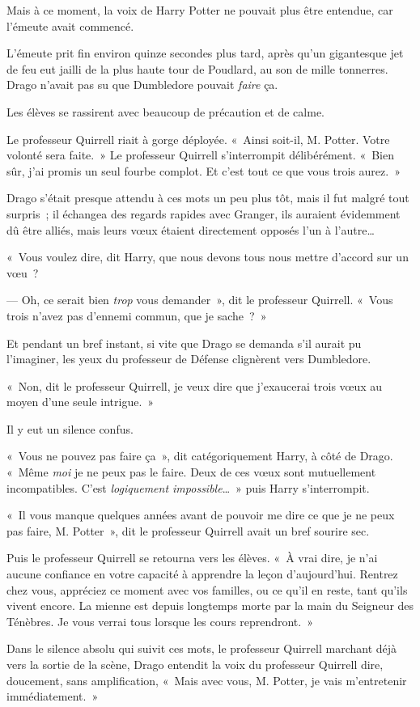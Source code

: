 Mais à ce moment, la voix de Harry Potter ne pouvait plus être entendue, car l'émeute avait commencé.

\later

L'émeute prit fin environ quinze secondes plus tard, après qu'un gigantesque jet de feu eut jailli de la plus haute tour de Poudlard, au son de mille tonnerres. Drago n'avait pas su que Dumbledore pouvait \emph{faire} ça.

Les élèves se rassirent avec beaucoup de précaution et de calme.

Le professeur Quirrell riait à gorge déployée. «~Ainsi soit-il, M. Potter. Votre volonté sera faite.~» Le professeur Quirrell s'interrompit délibérément. «~Bien sûr, j'ai promis un seul fourbe complot. Et c'est tout ce que vous trois aurez.~»

Drago s'était presque attendu à ces mots un peu plus tôt, mais il fut malgré tout surpris~; il échangea des regards rapides avec Granger, ils auraient évidemment dû être alliés, mais leurs vœux étaient directement opposés l'un à l'autre…

«~Vous voulez dire, dit Harry, que nous devons tous nous mettre d'accord sur un vœu~?

--- Oh, ce serait bien \emph{trop} vous demander~», dit le professeur Quirrell. «~Vous trois n'avez pas d'ennemi commun, que je sache~?~»

Et pendant un bref instant, si vite que Drago se demanda s'il aurait pu l'imaginer, les yeux du professeur de Défense clignèrent vers Dumbledore.

«~Non, dit le professeur Quirrell, je veux dire que j'exaucerai trois vœux au moyen d'une seule intrigue.~»

Il y eut un silence confus.

«~Vous ne pouvez pas faire ça~», dit catégoriquement Harry, à côté de Drago. «~Même \emph{moi} je ne peux pas le faire. Deux de ces vœux sont mutuellement incompatibles. C'est \emph{logiquement impossible}…~» puis Harry s'interrompit.

«~Il vous manque quelques années avant de pouvoir me dire ce que je ne peux pas faire, M. Potter~», dit le professeur Quirrell avait un bref sourire sec.

Puis le professeur Quirrell se retourna vers les élèves. «~À vrai dire, je n'ai aucune confiance en votre capacité à apprendre la leçon d'aujourd'hui. Rentrez chez vous, appréciez ce moment avec vos familles, ou ce qu'il en reste, tant qu'ils vivent encore. La mienne est depuis longtemps morte par la main du Seigneur des Ténèbres. Je vous verrai tous lorsque les cours reprendront.~»

Dans le silence absolu qui suivit ces mots, le professeur Quirrell marchant déjà vers la sortie de la scène, Drago entendit la voix du professeur Quirrell dire, doucement, sans amplification, «~Mais avec vous, M. Potter, je vais m'entretenir immédiatement.~»
